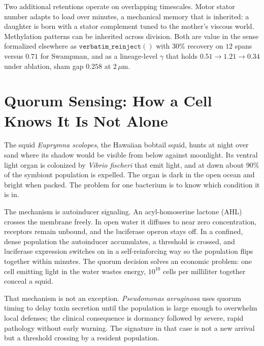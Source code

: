 \documentclass[12pt,a4paper]{article}
\begin{document}
Two additional retentions operate on overlapping timescales. Motor stator number adapts to load over minutes, a mechanical memory that is inherited: a daughter is born with a stator complement tuned to the mother's viscous world. Methylation patterns can be inherited across division. Both are value in the sense formalized elsewhere as $\mathtt{verbatim\_reinject()}$ with $30\%$ recovery on $12$ spans versus $0.71$ for Swampman, and as a lineage-level $\gamma$ that holds $0.51 \to 1.21 \to 0.34$ under ablation, sham gap $0.258$ at $2\,\mu\mathrm{m}$.

\section{Quorum Sensing: How a Cell Knows It Is Not Alone}
\label{sec:quorum}

The squid \emph{Euprymna scolopes}, the Hawaiian bobtail squid, hunts at night over sand where its shadow would be visible from below against moonlight. Its ventral light organ is colonized by \emph{Vibrio fischeri} that emit light, and at dawn about $90\%$ of the symbiont population is expelled. The organ is dark in the open ocean and bright when packed. The problem for one bacterium is to know which condition it is in.

The mechanism is autoinducer signaling. An acyl-homoserine lactone (AHL) crosses the membrane freely. In open water it diffuses to near zero concentration, receptors remain unbound, and the luciferase operon stays off. In a confined, dense population the autoinducer accumulates, a threshold is crossed, and luciferase expression switches on in a self-reinforcing way so the population flips together within minutes. The quorum decision solves an economic problem: one cell emitting light in the water wastes energy, $10^{10}$ cells per milliliter together conceal a squid.

That mechanism is not an exception. \emph{Pseudomonas aeruginosa} uses quorum timing to delay toxin secretion until the population is large enough to overwhelm local defenses; the clinical consequence is dormancy followed by severe, rapid pathology without early warning. The signature in that case is not a new arrival but a threshold crossing by a resident population.
\end{document}
